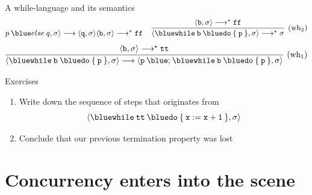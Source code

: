 \documentclass{beamer}
\begin{document}
\begin{frame}{A while-language and its semantics}
\[{{                        p \> {\blue else} \> q}, 
                        \sigma \rangle \longrightarrow \pv{\prog{q}}{\sigma}
                }{
                        \langle \mathtt{b}, \sigma \rangle \longrightarrow^\star \mathtt{ff} 
                } 
                \hspace{0.4cm}
                \infer[(\text{wh$_2$})]{
                        \langle 
                        \mathtt{{\blue while} \> b \> {\blue do} \> \{ \> p \> \}}, \sigma \rangle
                        \longrightarrow^\star \sigma
                }{
                        \langle \mathtt{b}, \sigma \rangle \longrightarrow^\star \mathtt{ff}
                }
        \]\vspace{0.001cm}
        \[
                \infer[(\text{wh$_1$})]{
                        \langle \mathtt{{\blue while} \> b \> {\blue do} \> \{ \> p \> \}}, 
                        \sigma \rangle
                        \longrightarrow 
                        \pv{\prog{p} \> {\blue ;} \> 
                        \mathtt{{\blue while} \> b \> {\blue do} \> \{ \> p \> \}}}{
                        \sigma}
                }{
                        \pv{\prog{b}}{\sigma} \longrightarrow^\star \prog{tt} 
                }
        \]
\end{frame}

\begin{frame}{Exercises}

        \begin{enumerate}
                \item Write down the sequence of steps that originates from
                        \[
                        \pv{\mathtt{{\blue while} \> \prog{tt} \> {\blue do} 
                        \> \{ \> x := x +1 \> \}}}{\sigma}
                        \]
                \item Conclude that our previous termination property was lost
        \end{enumerate}
\end{frame}

\section{Concurrency enters into the scene}
\end{document}
